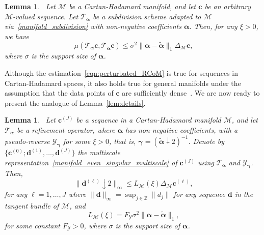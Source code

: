 \documentclass[12pt]{article}
\newtheorem{lemma}[theorem]{Lemma}
\begin{document}
\begin{lemma}~\label{lem:manifold_refinement_distance}
    Let $\mathcal{M}$ be a Cartan-Hadamard manifold, and let $\boldsymbol{c}$ be an arbitrary $\mathcal{M}$-valued sequence. Let $\mathcal{T}_{\boldsymbol{\alpha}}$ be a subdivision scheme adapted to $\mathcal{M}$ via~\eqref{manifold_subdivision} with non-negative coefficients $\boldsymbol{\alpha}$. Then, for any $\xi>0$, we have
    \begin{equation}~\label{eqn:perturbated_RCoM}
        \mu(\mathcal{T}_{\boldsymbol{\alpha}}\boldsymbol{c}, \mathcal{T}_{\widetilde{\boldsymbol{\alpha}}}\boldsymbol{c})\leq \sigma^2 \|\boldsymbol{\alpha}-\widetilde{\boldsymbol{\alpha}}\|_1\Delta_{\mathcal{M}}\boldsymbol{c},
    \end{equation}
    where $\sigma$ is the support size of $\boldsymbol{\alpha}$.
\end{lemma}

Although the estimation~\eqref{eqn:perturbated_RCoM} is true for sequences in Cartan-Hadamard spaces, it also holds true for general manifolds under the assumption that the data points of $\boldsymbol{c}$ are sufficiently dense~\cite{wallner2005convergence, wallner2006smoothness}. We are now ready to present the analogue of Lemma~\ref{lem:details}.

\begin{lemma}~\label{lem:Manifold_details}
    Let $\boldsymbol{c}^{(J)}$ be a sequence in a Cartan-Hadamard manifold $\mathcal{M}$, and let $\mathcal{T}_{\boldsymbol{\alpha}}$ be a refinement operator, where $\boldsymbol{\alpha}$ has non-negative coefficients, with a pseudo-reverse $\mathcal{Y}_{\boldsymbol{\gamma}}$ for some $\xi>0$, that is, $\boldsymbol{\gamma}=(\widetilde{\boldsymbol{\alpha}}\downarrow2)^{-1}$. Denote by $\{\boldsymbol{c}^{(0)};\boldsymbol{d}^{(1)},\dots,\boldsymbol{d}^{(J)}\}$ the multiscale representation~\eqref{manifold_even_singular_multiscale} of $\boldsymbol{c}^{(J)}$ using $\mathcal{T}_{\boldsymbol{\alpha}}$ and $\mathcal{Y}_{\boldsymbol{\gamma}}$. Then,
    \begin{equation}~\label{eqn:manifold_details_difference}
        \|\boldsymbol{d}^{(\ell)}\downarrow 2\|_\infty \leq L_\mathcal{M}(\xi) \Delta_\mathcal{M}\boldsymbol{c}^{(\ell)},
    \end{equation}
    for any $\ell=1,\dots,J$ where $\|\boldsymbol{d}\|_{\infty}=\sup_{j\in\mathbb{Z}}\|d_j\|$ for any sequence $\boldsymbol{d}$ in the tangent bundle of $\mathcal{M}$, and
    \begin{equation}~\label{eqn:constant_L_M}
        L_\mathcal{M}(\xi) = F_{\mathcal{Y}}\sigma^2\|\boldsymbol{\alpha}-\widetilde{\boldsymbol{\alpha}}\|_1,
    \end{equation}
    for some constant $F_{\mathcal{Y}}>0$, where $\sigma$ is the support size of $\boldsymbol{\alpha}$.
\end{lemma}
\end{document}
